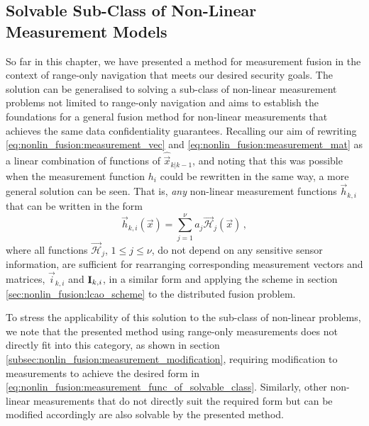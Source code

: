 \subsection{Solvable Sub-Class of Non-Linear Measurement Models}\label{subsec:nonlin_fusion:solvable_nonlin_class}
So far in this chapter, we have presented a method for measurement fusion in the context of range-only navigation that meets our desired security goals. The solution can be generalised to solving a sub-class of non-linear measurement problems not limited to range-only navigation and aims to establish the foundations for a general fusion method for non-linear measurements that achieves the same data confidentiality guarantees. Recalling our aim of rewriting \eqref{eq:nonlin_fusion:measurement_vec} and \eqref{eq:nonlin_fusion:measurement_mat} as a linear combination of functions of $\hat{\vec{x}}_{k|k-1}$, and noting that this was possible when the measurement function $h_i$ could be rewritten in the same way, a more general solution can be seen. That is, \textit{any} non-linear measurement functions $\vec{h}_{k,i}$ that can be written in the form
\begin{equation}\label{eq:nonlin_fusion:measurement_func_of_solvable_class}
    \vec{h}_{k,i}(\vec{x}) = \sum_{j=1}^\nu a_j\vec{\mathcal{H}}_j(\vec{x})\,,
\end{equation}
where all functions $\vec{\mathcal{H}}_j$, $1\leq j\leq \nu$, do not depend on any sensitive sensor information, are sufficient for rearranging corresponding measurement vectors and matrices, $\vec{i}_{k, i}$ and ${{\mathbf{I}}}_{k, i}$, in a similar form and applying the scheme in section \ref{sec:nonlin_fusion:lcao_scheme} to the distributed fusion problem. 

To stress the applicability of this solution to the sub-class of non-linear problems, we note that the presented method using range-only measurements does not directly fit into this category, as shown in section \ref{subsec:nonlin_fusion:measurement_modification}, requiring modification to measurements to achieve the desired form in \eqref{eq:nonlin_fusion:measurement_func_of_solvable_class}. Similarly, other non-linear measurements that do not directly suit the required form but can be modified accordingly are also solvable by the presented method.

% 
% 

